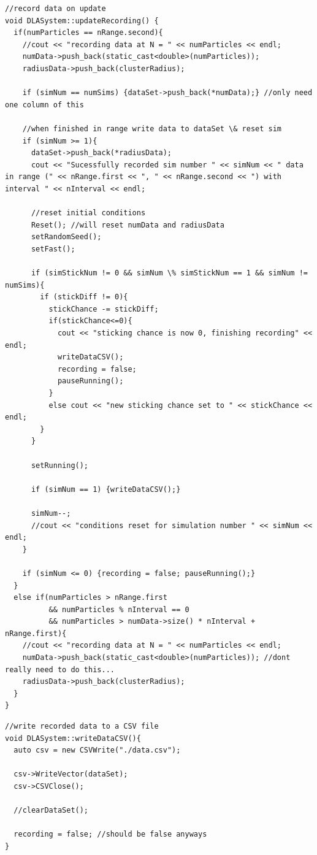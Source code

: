 \documentclass[10pt, twocolumn]{article} %
\begin{document}
\begin{lstlisting}
//record data on update
void DLASystem::updateRecording() {
  if(numParticles == nRange.second){
    //cout << "recording data at N = " << numParticles << endl;
    numData->push_back(static_cast<double>(numParticles));
    radiusData->push_back(clusterRadius);

    if (simNum == numSims) {dataSet->push_back(*numData);} //only need one column of this

    //when finished in range write data to dataSet \& reset sim
    if (simNum >= 1){
      dataSet->push_back(*radiusData);
      cout << "Sucessfully recorded sim number " << simNum << " data in range (" << nRange.first << ", " << nRange.second << ") with interval " << nInterval << endl;

      //reset initial conditions
      Reset(); //will reset numData and radiusData
      setRandomSeed();
      setFast();

      if (simStickNum != 0 && simNum \% simStickNum == 1 && simNum != numSims){
        if (stickDiff != 0){
          stickChance -= stickDiff;
          if(stickChance<=0){
            cout << "sticking chance is now 0, finishing recording" << endl;
            writeDataCSV();
            recording = false;
            pauseRunning();
          }
          else cout << "new sticking chance set to " << stickChance << endl;
        }
      }

      setRunning();

      if (simNum == 1) {writeDataCSV();}

      simNum--;
      //cout << "conditions reset for simulation number " << simNum << endl;
    }

    if (simNum <= 0) {recording = false; pauseRunning();}
  }
  else if(numParticles > nRange.first
          && numParticles % nInterval == 0
          && numParticles > numData->size() * nInterval + nRange.first){
    //cout << "recording data at N = " << numParticles << endl;
    numData->push_back(static_cast<double>(numParticles)); //dont really need to do this...
    radiusData->push_back(clusterRadius);
  }
}
\end{lstlisting}

\begin{lstlisting}
//write recorded data to a CSV file
void DLASystem::writeDataCSV(){
  auto csv = new CSVWrite("./data.csv");

  csv->WriteVector(dataSet);
  csv->CSVClose();

  //clearDataSet();

  recording = false; //should be false anyways
}
\end{lstlisting}
\end{document}
